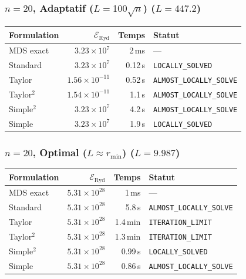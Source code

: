 \subsubsection{$n=20$, Adaptatif ($L{=}100\sqrt{n}$) ($L=447.2$)}
\begin{longtable}{@{}lrrl@{}}
  \toprule
  Formulation & $\mathcal{E}_{\mathrm{Ryd}}$ & Temps & Statut \\
  \midrule
  \endhead
  MDS exact & $3.23\times10^{7}$ & 2\,ms & --- \\
  Standard & $3.23\times10^{7}$ & 0.12\,s & \texttt{LOCALLY\_SOLVED} \\
  Taylor & $1.56\times10^{-11}$ & 0.52\,s & \texttt{ALMOST\_LOCALLY\_SOLVE} \\
  Taylor$^2$ & $1.54\times10^{-11}$ & 1.1\,s & \texttt{ALMOST\_LOCALLY\_SOLVE} \\
  Simple$^2$ & $3.23\times10^{7}$ & 4.2\,s & \texttt{ALMOST\_LOCALLY\_SOLVE} \\
  Simple & $3.23\times10^{7}$ & 1.9\,s & \texttt{LOCALLY\_SOLVED} \\
  \bottomrule
\end{longtable}

\subsubsection{$n=20$, Optimal ($L{\approx}r_{\min}$) ($L=9.987$)}
\begin{longtable}{@{}lrrl@{}}
  \toprule
  Formulation & $\mathcal{E}_{\mathrm{Ryd}}$ & Temps & Statut \\
  \midrule
  \endhead
  MDS exact & $5.31\times10^{28}$ & 1\,ms & --- \\
  Standard & $5.31\times10^{28}$ & 5.8\,s & \texttt{ALMOST\_LOCALLY\_SOLVE} \\
  Taylor & $5.31\times10^{28}$ & 1.4\,min & \texttt{ITERATION\_LIMIT} \\
  Taylor$^2$ & $5.31\times10^{28}$ & 1.3\,min & \texttt{ITERATION\_LIMIT} \\
  Simple$^2$ & $5.31\times10^{28}$ & 0.99\,s & \texttt{LOCALLY\_SOLVED} \\
  Simple & $5.31\times10^{28}$ & 0.86\,s & \texttt{ALMOST\_LOCALLY\_SOLVE} \\
  \bottomrule
\end{longtable}

